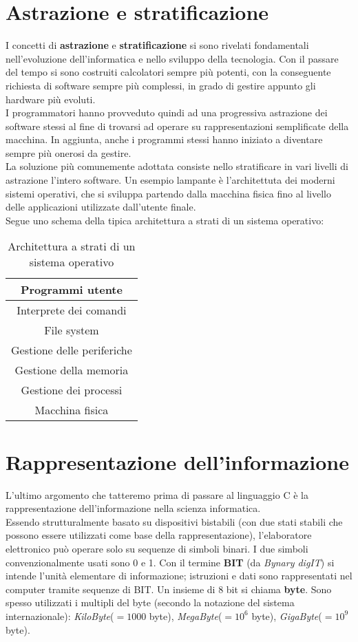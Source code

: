 \section{Astrazione e stratificazione}
I concetti di \textbf{astrazione} e \textbf{stratificazione} si sono rivelati fondamentali nell'evoluzione dell'informatica e nello sviluppo della tecnologia. Con il passare del tempo si sono costruiti calcolatori sempre più potenti, con la conseguente richiesta di software sempre più complessi, in grado di gestire appunto gli hardware più evoluti.\\
I programmatori hanno provveduto quindi ad una progressiva astrazione dei software stessi al fine di trovarsi ad operare su rappresentazioni semplificate della macchina. In aggiunta, anche i programmi stessi hanno iniziato a diventare sempre più onerosi da gestire.\\
La soluzione più comunemente adottata consiste nello stratificare in vari livelli di astrazione l'intero software. Un esempio lampante è l'architettuta dei moderni sistemi operativi, che si sviluppa partendo dalla macchina fisica fino al livello delle applicazioni utilizzate dall'utente finale.\\
Segue uno schema della tipica architettura a strati di un sistema operativo:
\begin{table}[!ht]
	\centering
	\label{Strati-OS}
	\begin{tabular}{c}
		\hline
		Programmi utente           \\ \hline
		Interprete dei comandi     \\ \hline
		File system                \\ \hline
		Gestione delle periferiche \\ \hline
		Gestione della memoria     \\ \hline
		Gestione dei processi      \\ \hline
		Macchina fisica            \\ \hline
	\end{tabular}
\caption{Architettura a strati di un sistema operativo}
\end{table}

\section{Rappresentazione dell'informazione}
L'ultimo argomento che tatteremo prima di passare al linguaggio C è la rappresentazione dell'informazione nella scienza informatica.\\
Essendo strutturalmente basato su dispositivi bistabili (con due stati stabili che possono essere utilizzati come base della rappresentazione), l'elaboratore elettronico può operare solo su sequenze di simboli binari. I due simboli convenzionalmente usati sono 0 e 1. Con il termine \textbf{BIT} (da \textit{Bynary digIT}) si intende l’unità elementare di informazione; istruzioni e dati sono rappresentati nel computer tramite sequenze di BIT. Un insieme di 8 bit si chiama \textbf{byte}. Sono spesso utilizzati i multipli del byte (secondo la notazione del sistema internazionale): \textit{KiloByte}($=1000$ byte), \textit{MegaByte}($=10^{6}$ byte), \textit{GigaByte}($=10^{9}$ byte).


